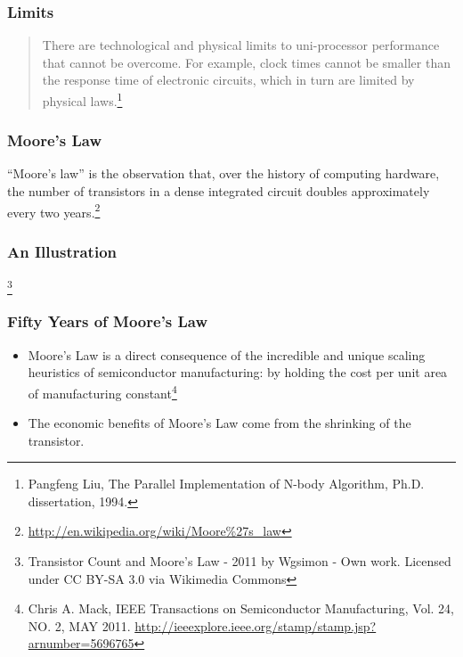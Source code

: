 \documentclass{beamer}
\begin{document}
\begin{CJK}{UTF8}{bsmi}
\begin{frame}
\frametitle{Limits}
\begin{quote}There are technological and physical limits to uni-processor
  performance that cannot be overcome.  For example, clock times cannot
  be smaller than the response time of electronic circuits, which in
  turn are limited by physical laws.\footnote{Pangfeng Liu, The Parallel
    Implementation of N-body Algorithm, Ph.D. dissertation, 1994.}
\end{quote}
\end{frame}

\begin{frame}
\frametitle{Moore's Law}
``Moore's law'' is the observation that, over the history of computing
hardware, the number of transistors in a dense integrated circuit
doubles approximately every two
years.\footnote{\url{http://en.wikipedia.org/wiki/Moore\%27s_law}}
\end{frame}

\begin{frame}
\frametitle{An Illustration}
\centerline{}\footnote{Transistor
  Count and Moore's Law - 2011 by Wgsimon - Own work. Licensed under
  CC BY-SA 3.0 via Wikimedia Commons}
\end{frame}

\begin{frame}
\frametitle{Fifty Years of Moore's Law}
\begin{itemize}
\item Moore's Law is a direct consequence of the incredible and unique
  scaling heuristics of semiconductor manufacturing: by holding the
  cost per unit area of manufacturing constant\footnote{Chris
    A. Mack, IEEE Transactions on Semiconductor Manufacturing,
    Vol. 24, NO. 2, MAY
    2011. \url{http://ieeexplore.ieee.org/stamp/stamp.jsp?arnumber=5696765}}
\item The economic benefits of Moore's Law come from the shrinking of
  the transistor.
\end{itemize}
\end{frame}


\end{CJK}
\end{document}
